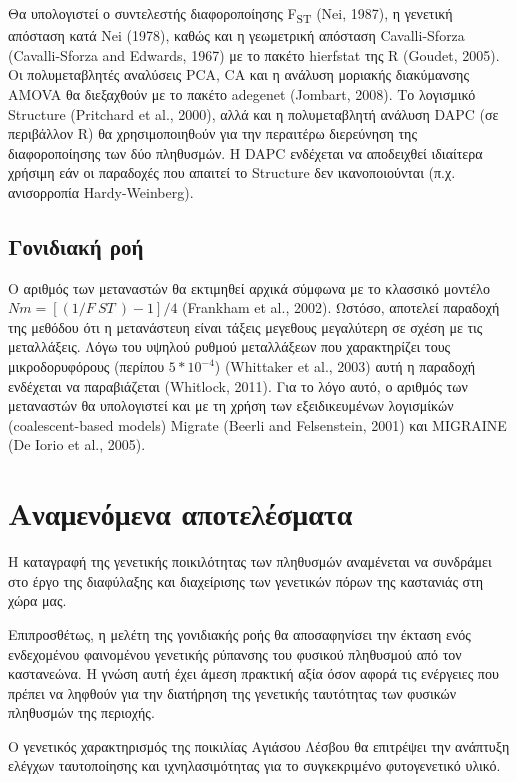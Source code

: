 \documentclass[12pt,a4paper,]{report}
\begin{document}
Θα υπολογιστεί ο συντελεστής διαφοροποίησης F\textsubscript{ST} (Nei,
1987), η γενετική απόσταση κατά Nei (1978), καθώς και η γεωμετρική
απόσταση Cavalli-Sforza (Cavalli-Sforza and Edwards, 1967) με το πακέτο
hierfstat της R (Goudet, 2005). Οι πολυμεταβλητές αναλύσεις PCA, CA και
η ανάλυση μοριακής διακύμανσης AMOVA θα διεξαχθούν με το πακέτο adegenet
(Jombart, 2008). Το λογισμικό Structure (Pritchard et al., 2000), αλλά
και η πολυμεταβλητή ανάλυση DAPC (σε περιβάλλον R) θα χρησιμοποιηθoύν
για την περαιτέρω διερεύνηση της διαφοροποίησης των δύο πληθυσμών. H
DAPC ενδέχεται να αποδειχθεί ιδιαίτερα χρήσιμη εάν οι παραδοχές που
απαιτεί το Structure δεν ικανοποιούνται (π.χ. ανισορροπία
Hardy-Weinberg).

\hypertarget{-}{%
\subsection{Γονιδιακή ροή}\label{-}}

Ο αριθμός των μεταναστών θα εκτιμηθεί αρχικά σύμφωνα με το κλασσικό
μοντέλο \(Nm = [(1 / F~ST~) - 1] / 4\) (Frankham et al., 2002). Ωστόσο,
αποτελεί παραδοχή της μεθόδου ότι η μετανάστευη είναι τάξεις μεγεθους
μεγαλύτερη σε σχέση με τις μεταλλάξεις. Λόγω του υψηλού ρυθμού
μεταλλάξεων που χαρακτηρίζει τους μικροδορυφόρους (περίπου
\(5 * 10^{-4}\)) (Whittaker et al., 2003) αυτή η παραδοχή ενδέχεται να
παραβιάζεται (Whitlock, 2011). Για το λόγο αυτό, ο αριθμός των
μεταναστών θα υπολογιστεί και με τη χρήση των εξειδικευμένων λογισμίκών
(coalescent-based models) Migrate (Beerli and Felsenstein, 2001) και
MIGRAINE (De Iorio et al., 2005).

\hypertarget{-}{%
\section{Αναμενόμενα αποτελέσματα}\label{-}}

H καταγραφή της γενετικής ποικιλότητας των πληθυσμών αναμένεται να
συνδράμει στο έργο της διαφύλαξης και διαχείρισης των γενετικών πόρων
της καστανιάς στη χώρα μας.

Επιπροσθέτως, η μελέτη της γονιδιακής ροής θα αποσαφηνίσει την έκταση
ενός ενδεχομένου φαινομένου γενετικής ρύπανσης του φυσικού πληθυσμού από
τον καστανεώνα. Η γνώση αυτή έχει άμεση πρακτική αξία όσον αφορά τις
ενέργειες που πρέπει να ληφθούν για την διατήρηση της γενετικής
ταυτότητας των φυσικών πληθυσμών της περιοχής.

Ο γενετικός χαρακτηρισμός της ποικιλίας Αγιάσου Λέσβου θα επιτρέψει την
ανάπτυξη ελέγχων ταυτοποίησης και ιχνηλασιμότητας για το συγκεκριμένο
φυτογενετικό υλικό.
\end{document}
